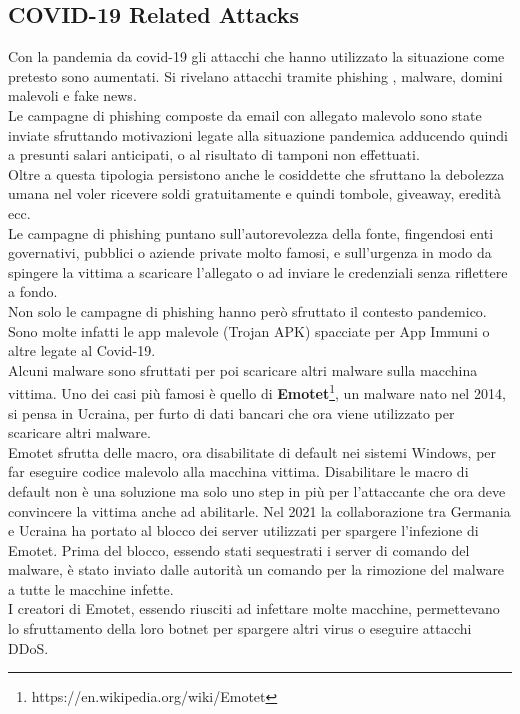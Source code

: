 \subsection{COVID-19 Related Attacks}
\label{subsec:covid19relatedattacks}
Con la pandemia da covid-19 gli attacchi che hanno utilizzato la situazione come pretesto sono aumentati. Si rivelano attacchi tramite phishing \cite{medicalequipmenttargeted}, malware, domini malevoli e fake news.\\
Le campagne di phishing composte da email con allegato malevolo sono state inviate sfruttando motivazioni legate alla situazione pandemica adducendo quindi a presunti salari anticipati, o al risultato di tamponi non effettuati.\\
Oltre a questa tipologia persistono anche le cosiddette  che sfruttano la debolezza umana nel voler ricevere soldi gratuitamente e quindi tombole, giveaway, eredità ecc.\\
Le campagne di phishing puntano sull'autorevolezza della fonte, fingendosi enti governativi, pubblici o aziende private molto famosi, e sull'urgenza in modo da spingere la vittima a scaricare l'allegato o ad inviare le credenziali senza riflettere a fondo.\\
Non solo le campagne di phishing hanno però sfruttato il contesto pandemico.
Sono molte infatti le app malevole (Trojan \acrfull{APK}) spacciate per App Immuni o altre legate al Covid-19.\\
Alcuni malware sono sfruttati per poi scaricare altri malware sulla macchina vittima.
Uno dei casi più famosi è quello di \textbf{Emotet}\footnote{https://en.wikipedia.org/wiki/Emotet}, un malware nato nel 2014, si pensa in Ucraina, per furto di dati bancari che ora viene utilizzato per scaricare altri malware.\\
Emotet sfrutta delle macro, ora disabilitate di default nei sistemi Windows, per far eseguire codice malevolo alla macchina vittima.
Disabilitare le macro di default non è una soluzione ma solo uno step in più per l'attaccante che ora deve convincere la vittima anche ad abilitarle.
Nel 2021 la collaborazione tra Germania e Ucraina ha portato al blocco dei server utilizzati per spargere l'infezione di Emotet. Prima del blocco, essendo stati sequestrati i server di comando del malware, è stato inviato dalle autorità un comando per la rimozione del malware a tutte le macchine infette.\\
I creatori di Emotet, essendo riusciti ad infettare molte macchine, permettevano lo sfruttamento della loro botnet per spargere altri virus o eseguire attacchi \acrshort{DDoS}.\ 
